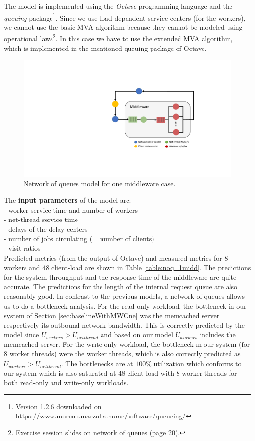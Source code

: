 The model is implemented using the \textit{Octave} programming language and the \textit{queuing} package\footnote{Version 1.2.6 downloaded on \url{https://www.moreno.marzolla.name/software/queueing/}}.
Since we use load-dependent service centers (for the workers), we cannot use the basic MVA algorithm because they cannot be modeled using operational laws\footnote{Exercise session slides on network of queues (page 20).}. In this case we have to use the extended MVA algorithm, which is implemented in the mentioned queuing package of Octave.

\begin{figure}[!ht]
    \centering
	\includegraphics[scale=0.6]{figures/6_NoQ/NoQ_figure_one_mw.pdf}
	\caption{Network of queues model for one middleware case.}
	\label{NoQ_one_mw}
\end{figure}

The \textbf{input parameters} of the model are: \\
- worker service time and number of workers \\
- net-thread service time \\
- delays of the delay centers \\
- number of jobs circulating (= number of clients) \\
- visit ratios \\

Predicted metrics (from the output of Octave) and measured metrics for 8 workers and 48 client-load are shown in Table \ref{table:noq_1midd}. 
The predictions for the system throughput and the response time of the middleware are quite accurate. The predictions for the length of the internal request queue are also reasonably good. 
In contrast to the previous models, a network of queues allows us to do a bottleneck analysis. For the read-only workload, the bottleneck in our system of Section \ref{sec:baselineWithMWOne} was the memcached server respectively its outbound network bandwidth. This is correctly predicted by the model since $U_{workers} > U_{netthread}$ and based on our model $U_{workers}$ includes the memcached server. For the write-only workload, the bottleneck in our system (for 8 worker threads) were the worker threads, which is also correctly predicted as $U_{workers} > U_{netthread}$. The bottlenecks are at $100\%$ utilization which conforms to our system which is also saturated at 48 client-load with 8 worker threads for both read-only and write-only workloads.

